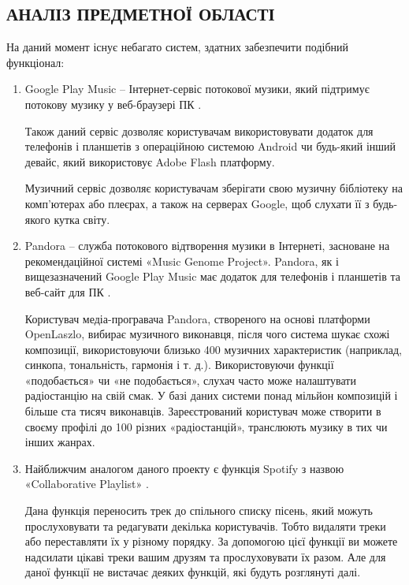 \begin{center}\chapter{АНАЛІЗ ПРЕДМЕТНОЇ ОБЛАСТІ}\end{center}

На даний момент існує небагато систем, здатних забезпечити подібний функціонал:
\begin{enumerate}[label=\alph*)]
  \item
    Google Play Music – Інтернет-сервіс потокової музики, який підтримує потокову музику у веб-браузері ПК .


    Також даний сервіс дозволяє користувачам використовувати додаток для телефонів і планшетів з операційною системою Android чи будь-який інший девайс, який використовує Adobe Flash платформу.

    Музичний сервіс дозволяє користувачам зберігати свою музичну бібліотеку на комп’ютерах або плеєрах, а також на серверах Google, щоб слухати її з будь-якого кутка світу.
  \item
    Pandora – служба потокового відтворення музики в Інтернеті, засноване на рекомендаційної системі «Music Genome Project». Pandora, як і вищезазначений Google Play Music має додаток для телефонів і планшетів та веб-сайт для ПК .


    Користувач медіа-програвача Pandora, створеного на основі платформи OpenLaszlo, вибирає музичного виконавця, після чого система шукає схожі композиції, використовуючи близько 400 музичних характеристик (наприклад, синкопа, тональність, гармонія і т. д.). Використовуючи функції «подобається» чи «не подобається», слухач часто може налаштувати радіостанцію на свій смак. У базі даних системи понад мільйон композицій і більше ста тисяч виконавців. Зареєстрований користувач може створити в своєму профілі до 100 різних «радіостанцій», транслюють музику в тих чи інших жанрах.

  \item
    Найближчим аналогом даного проекту є функція  Spotify з назвою «Collaborative Playlist» .


    Дана функція переносить трек до спільного списку пісень, який можуть прослуховувати та редагувати декілька користувачів. Тобто видаляти треки або переставляти їх у різному порядку. За допомогою цієї функції ви можете надсилати цікаві треки вашим друзям та прослуховувати їх разом. Але для даної функції не вистачає деяких функцій, які будуть розглянуті далі.


\end{enumerate}
